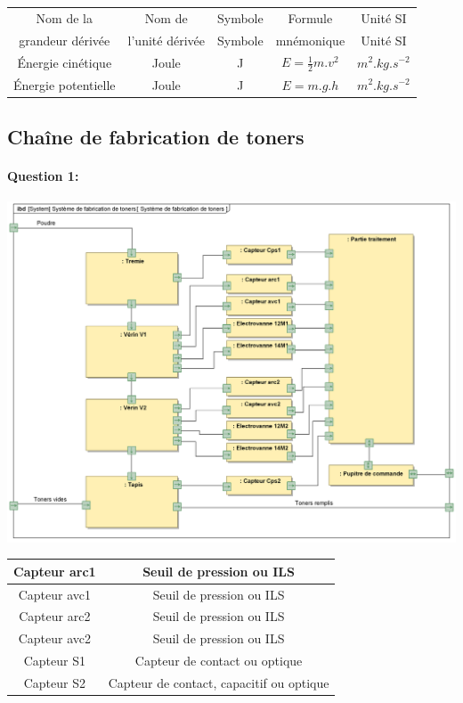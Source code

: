 \begin{center}
\begin{tabular}{|c|c|c|c|c|}
\hline
Nom de la & Nom de & Symbole & Formule & Unité SI \\
grandeur dérivée & l'unité dérivée & Symbole & mnémonique & Unité SI \\
\hline
Énergie cinétique & Joule & J & $E=\frac{1}{2}m.v^2$ & $m^2.kg.s^{-2}$ \\
\hline
Énergie potentielle & Joule & J & $E=m.g.h$ & $m^2.kg.s^{-2}$ \\
\hline
\end{tabular}
\end{center}

\newpage

\subsection{Chaîne de fabrication de toners}

\paragraph{Question 1:}

\begin{center}
	\includegraphics[width=0.8\linewidth]{img/Toners_interne}
\end{center}

\begin{center}
\begin{tabular}{|c|c|}
\hline
Capteur arc1 & Seuil de pression ou ILS \\
\hline
Capteur avc1 & Seuil de pression ou ILS \\
\hline
Capteur arc2 & Seuil de pression ou ILS \\
\hline
Capteur avc2 & Seuil de pression ou ILS \\
\hline
Capteur S1 & Capteur de contact ou optique \\
\hline
Capteur S2 & Capteur de contact, capacitif ou optique \\
\hline
\end{tabular}
\end{center}


